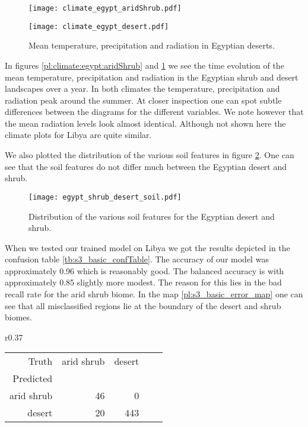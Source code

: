 \begin{figure}[h]
  \centering
  \begin{minipage}{0.45\textwidth}
    \centering
    \texttt{[image: climate\_egypt\_aridShrub.pdf]}
    \caption{Mean temperature, precipitation and radiation in Egyptian shrubs.}
    \label{pl:climate:egypt:aridShrub}
  \end{minipage}
  \hfill
  \begin{minipage}{0.45\textwidth}
    \centering
    \texttt{[image: climate\_egypt\_desert.pdf]}
    \caption{Mean temperature, precipitation and radiation in Egyptian deserts.}
    \label{pl:climate:egypt:desert}
  \end{minipage}
\end{figure}
In figures \ref{pl:climate:egypt:aridShrub} and \ref{pl:climate:egypt:desert}
we see the time evolution of the mean temperature, precipitation and radiation
in the Egyptian shrub and desert landscapes over a year.
In both climates the temperature, precipitation and radiation peak around the summer.
At closer inspection one can spot subtle differences between the diagrams for the different
variables. We note however that the mean radiation levels look almost identical.
Although not shown here the climate plots for Libya are quite similar.

We also plotted the distribution of the various soil features in figure \ref{pl:egypt_shrub_desert_soil}.
One can see that the soil features do not differ much between the Egyptian desert and shrub.
\begin{figure}[h]
  \centering
  \texttt{[image: egypt\_shrub\_desert\_soil.pdf]}
  \caption{Distribution of the various soil features for the Egyptian desert and shrub.}
  \label{pl:egypt_shrub_desert_soil}
\end{figure}

When we tested our trained model on Libya we got the results depicted in the confusion table 
\ref{tb:s3_basic_confTable}. The accuracy of our model was approximately 0.96 which is reasonably good. The balanced accuracy is with
approximately 0.85 slightly more modest.
The reason for this lies in the bad recall rate for the arid shrub biome.
In the map \ref{pl:s3_basic_error_map} one can see that all misclassified regions lie at the boundary of
the desert and shrub biomes.
\begin{wraptable}{r}{0.37\textwidth}
  \centering
  \begin{tabular}{rrrrr}
    \toprule
    Truth & arid shrub & desert \\
    Predicted & & \\
    \midrule
    arid shrub & 46 & 0 \\
    desert & 20 & 443 \\
    \bottomrule
  \end{tabular}
  \caption{Confusion table.}
  \label{tb:s3_basic_confTable}
\end{wraptable}

